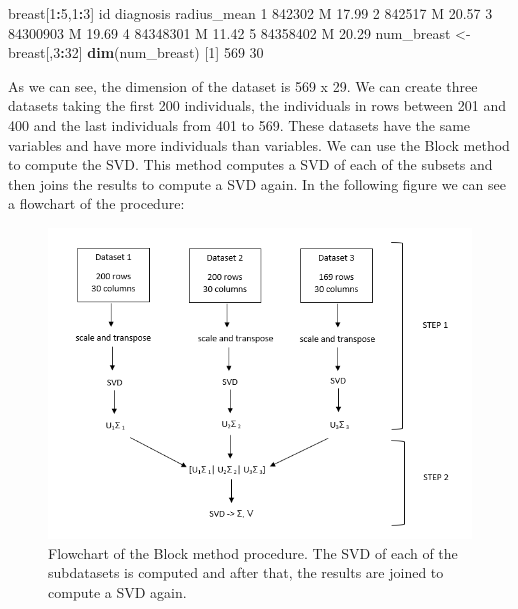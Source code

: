 \documentclass[]{article}
\newenvironment{Shaded}{\begin{snugshade}}{\end{snugshade}}
\newcommand{\KeywordTok}[1]{\textcolor[rgb]{0.13,0.29,0.53}{\textbf{#1}}}
\newcommand{\DecValTok}[1]{\textcolor[rgb]{0.00,0.00,0.81}{#1}}
\newcommand{\FloatTok}[1]{\textcolor[rgb]{0.00,0.00,0.81}{#1}}
\newcommand{\StringTok}[1]{\textcolor[rgb]{0.31,0.60,0.02}{#1}}
\newcommand{\OperatorTok}[1]{\textcolor[rgb]{0.81,0.36,0.00}{\textbf{#1}}}
\newcommand{\NormalTok}[1]{#1}
\begin{document}
\begin{Shaded}
\begin{Highlighting}[]
\NormalTok{breast[}\DecValTok{1}\OperatorTok{:}\DecValTok{5}\NormalTok{,}\DecValTok{1}\OperatorTok{:}\DecValTok{3}\NormalTok{]}
\NormalTok{        id diagnosis radius_mean}
\DecValTok{1}   \DecValTok{842302}\NormalTok{         M       }\FloatTok{17.99}
\DecValTok{2}   \DecValTok{842517}\NormalTok{         M       }\FloatTok{20.57}
\DecValTok{3} \DecValTok{84300903}\NormalTok{         M       }\FloatTok{19.69}
\DecValTok{4} \DecValTok{84348301}\NormalTok{         M       }\FloatTok{11.42}
\DecValTok{5} \DecValTok{84358402}\NormalTok{         M       }\FloatTok{20.29}
\NormalTok{num_breast <-}\StringTok{ }\NormalTok{breast[,}\DecValTok{3}\OperatorTok{:}\DecValTok{32}\NormalTok{]}
\KeywordTok{dim}\NormalTok{(num_breast)}
\NormalTok{[}\DecValTok{1}\NormalTok{] }\DecValTok{569}  \DecValTok{30}
\end{Highlighting}
\end{Shaded}

As we can see, the dimension of the dataset is 569 x 29. We can create
three datasets taking the first 200 individuals, the individuals in rows
between 201 and 400 and the last individuals from 401 to 569. These
datasets have the same variables and have more individuals than
variables. We can use the Block method to compute the SVD. This method
computes a SVD of each of the subsets and then joins the results to
compute a SVD again. In the following figure we can see a flowchart of
the procedure:

\begin{figure}

{\centering \includegraphics[width=1.5\linewidth]{esquema_exemple1} 

}

\caption{Flowchart of the Block method procedure. The SVD of each of the subdatasets is computed and after that, the results are joined to compute a SVD again. }\label{fig:breast1c}
\end{figure}
\end{document}
